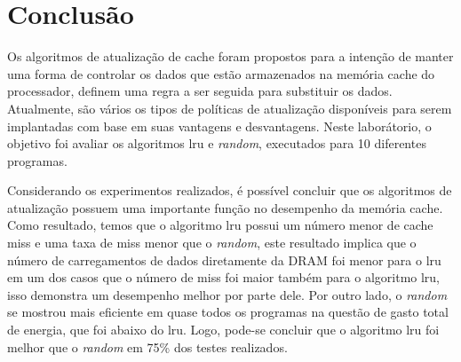 \documentclass[12pt]{article}
\begin{document}
\section{Conclusão}

Os algoritmos de atualização de cache foram propostos para a intenção de manter uma forma de controlar os dados que estão armazenados na memória cache do processador, definem uma regra a ser seguida para substituir os dados. Atualmente, são vários os tipos de políticas de atualização disponíveis para serem implantadas com base em suas vantagens e desvantagens. Neste laborátorio, o objetivo foi avaliar os algoritmos lru e \textit{random}, executados para 10 diferentes programas.

Considerando os experimentos realizados, é possível concluir que os algoritmos de atualização possuem uma importante função no desempenho da memória cache. Como resultado, temos que o algoritmo lru possui um número menor de cache miss e uma taxa de miss menor que o \textit{random}, este resultado implica que o número de carregamentos de dados diretamente da DRAM foi menor para o lru em um dos casos que o número de miss foi maior também para o algoritmo lru, isso demonstra um desempenho melhor por parte dele. Por outro lado, o \textit{random} se mostrou mais eficiente em quase todos os programas na questão de gasto total de energia, que foi abaixo do lru. Logo, pode-se concluir que o algoritmo lru foi melhor que o \textit{random} em 75\% dos testes realizados.




\end{document}

